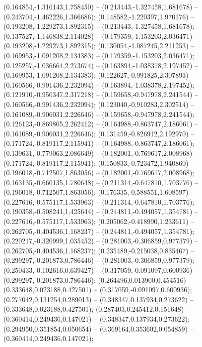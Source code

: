  (0.164854,-1.316143,1.758450) -- (0.213443,-1.327458,1.681678) -- (0.243704,-1.462226,1.366686);
 (0.148582,-1.220397,1.970176) -- (0.193208,-1.229273,1.892315) -- (0.213443,-1.327458,1.681678);
 (0.137527,-1.146838,2.114028) -- (0.179359,-1.153203,2.036471) -- (0.193208,-1.229273,1.892315);
 (0.130054,-1.087245,2.211253) -- (0.169953,-1.091208,2.134383) -- (0.179359,-1.153203,2.036471);
 (0.125257,-1.036664,2.273674) -- (0.163894,-1.038378,2.197452) -- (0.169953,-1.091208,2.134383);
 (0.122627,-0.991825,2.307893) -- (0.160566,-0.991436,2.232094) -- (0.163894,-1.038378,2.197452);
 (0.121910,-0.950347,2.317218) -- (0.159658,-0.947978,2.241544) -- (0.160566,-0.991436,2.232094);
 (0.123040,-0.910283,2.302514) -- (0.161089,-0.906031,2.226646) -- (0.159658,-0.947978,2.241544);
 (0.126123,-0.869805,2.262412) -- (0.164988,-0.863747,2.186061) -- (0.161089,-0.906031,2.226646);
 (0.131459,-0.826912,2.192970) -- (0.171724,-0.819117,2.115941) -- (0.164988,-0.863747,2.186061);
 (0.139631,-0.779063,2.086649) -- (0.182001,-0.769617,2.008968) -- (0.171724,-0.819117,2.115941);
 (0.150833,-0.723472,1.940860) -- (0.196018,-0.712507,1.863056) -- (0.182001,-0.769617,2.008968);
 (0.163135,-0.660135,1.780648) -- (0.211314,-0.647810,1.703776) -- (0.196018,-0.712507,1.863056);
 (0.176335,-0.588551,1.608597) -- (0.227616,-0.575117,1.533963) -- (0.211314,-0.647810,1.703776);
 (0.190358,-0.508241,1.425644) -- (0.244811,-0.494057,1.354781) -- (0.227616,-0.575117,1.533963);
 (0.205062,-0.418990,1.233611) -- (0.262705,-0.404536,1.168237) -- (0.244811,-0.494057,1.354781);
 (0.220217,-0.320999,1.035452) -- (0.281003,-0.306859,0.977379) -- (0.262705,-0.404536,1.168237);
 (0.235489,-0.215038,0.835467) -- (0.299297,-0.201873,0.786446) -- (0.281003,-0.306859,0.977379);
 (0.250433,-0.102616,0.639427) -- (0.317059,-0.091097,0.600936) -- (0.299297,-0.201873,0.786446);
 (0.264496,0.013900,0.454516) -- (0.333648,0.023188,0.427501) -- (0.317059,-0.091097,0.600936);
 (0.277042,0.131254,0.289013) -- (0.348347,0.137934,0.273622) -- (0.333648,0.023188,0.427501);
 (0.287403,0.245412,0.151648) -- (0.360414,0.249436,0.147021) -- (0.348347,0.137934,0.273622);
 (0.294950,0.351854,0.050654) -- (0.369164,0.353602,0.054859) -- (0.360414,0.249436,0.147021);
